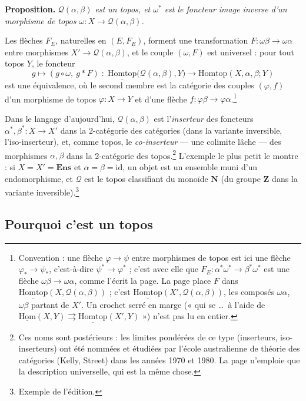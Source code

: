\documentclass[11pt,a4paper]{article}
\begin{document}
\textbf{Proposition.} \emph{$\mathcal{Q}(\alpha, \beta)$ est un topos, et
$\omega^{*}$ est le foncteur image inverse d'un morphisme de topos
$\omega : X \to \mathcal{Q}(\alpha, \beta)$.}

Les flèches $F_E$, naturelles en $(E, F_E)$, forment une transformation
$F : \omega\beta \to \omega\alpha$ entre morphismes
$X' \to \mathcal{Q}(\alpha,\beta)$, et le couple $(\omega, F)$ est
universel : pour tout topos $Y$, le foncteur
\[
g \longmapsto (g \circ \omega,\ g * F) \;:\;
\underline{\mathrm{Homtop}}\bigl(\mathcal{Q}(\alpha, \beta), Y\bigr)
\longrightarrow \underline{\mathrm{Homtop}}(X, \alpha, \beta ; Y)
\]
est une équivalence, où le second membre est la catégorie des couples
$(\varphi, f)$ d'un morphisme de topos $\varphi : X \to Y$ et d'une flèche
$f : \varphi\beta \to \varphi\alpha$.\footnote{Convention : une flèche
$\varphi \to \psi$ entre morphismes de topos est ici une flèche
$\varphi_* \to \psi_*$, c'est-à-dire $\psi^{*} \to \varphi^{*}$ ; c'est avec
elle que $F_E : \alpha^{*}\omega^{*} \to \beta^{*}\omega^{*}$ est une flèche
$\omega\beta \to \omega\alpha$, comme l'écrit la page. La page place $F$ dans
$\underline{\mathrm{Homtop}}(X, \mathcal{Q}(\alpha,\beta))$ ; c'est
$\underline{\mathrm{Homtop}}(X', \mathcal{Q}(\alpha,\beta))$, les composés
$\omega\alpha$, $\omega\beta$ partant de $X'$. Un crochet serré en marge
(« qui se \ldots\ à l'aide de $\underline{\mathrm{Hom}}(X, Y)
\rightrightarrows \underline{\mathrm{Homtop}}(X', Y)$ ») n'est pas lu en
entier.}

Dans le langage d'aujourd'hui, $\mathcal{Q}(\alpha, \beta)$ est
l'\emph{inserteur} des foncteurs $\alpha^{*}, \beta^{*} : X \to X'$ dans la
2-catégorie des catégories (dans la variante inversible, l'iso-inserteur),
et, comme topos, le \emph{co-inserteur} — une colimite lâche — des morphismes
$\alpha, \beta$ dans la 2-catégorie des topos.\footnote{Ces noms sont
postérieurs : les limites pondérées de ce type (inserteurs, iso-inserteurs)
ont été nommées et étudiées par l'école australienne de théorie des
catégories (Kelly, Street) dans les années 1970 et 1980. La page n'emploie que
la description universelle, qui est la même chose.} L'exemple le plus petit
le montre : si $X = X' = \mathbf{Ens}$ et $\alpha = \beta = \mathrm{id}$, un
objet est un ensemble muni d'un endomorphisme, et $\mathcal{Q}$ est le topos
classifiant du monoïde $\mathbf{N}$ (du groupe $\mathbf{Z}$ dans la variante
inversible).\footnote{Exemple de l'édition.}

\subsection*{Pourquoi c'est un topos}
\end{document}

